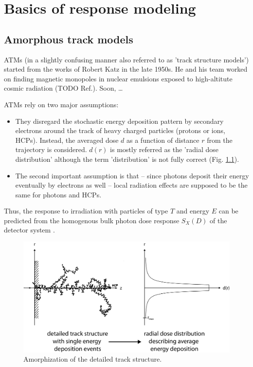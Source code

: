\chapter{Basics of response modeling}

\section{Amorphous track models}
ATMs (in a slightly confusing manner also referred to as 'track structure
models') started from the works of Robert Katz in the late 1950s. He and his
team worked on finding magnetic monopoles in nuclear emulsions exposed to
high-altitute cosmic radiation (TODO Ref.). Soon, \ldots

ATMs rely on two major assumptions:

\begin{itemize}
\item{They disregard the stochastic energy deposition pattern by secondary
electrons around the track of heavy charged particles (protons or
ions, HCPs). Instead, the averaged dose $d$ as a function of
distance $r$ from the trajectory is considered. $d(r)$ is mostly referred as the
'radial dose distribution' although the term 'distribution' is not fully correct
(Fig. \ref{fig:TST}).}
\item{The second important assumption is that -- since photons deposit their
energy eventually by electrons as well -- local radiation effects are supposed
to be the same for photons and HCPs.}
\end{itemize}
Thus, the response to irradiation with particles of type $T$ and energy $E$ can
be predicted from the homogenous bulk photon dose response $S_X(D)$ of the
detector system \cite{Katz_et_al_1972, Waligorski_and_Katz_1980}.

\begin{figure}
	\centering
		\includegraphics[width=1.0\textwidth]{pictures/TrackStructureDetailAndRDD.png}
	\caption{Amorphization of the detailed track structure.}
	\label{fig:TST}
\end{figure}



